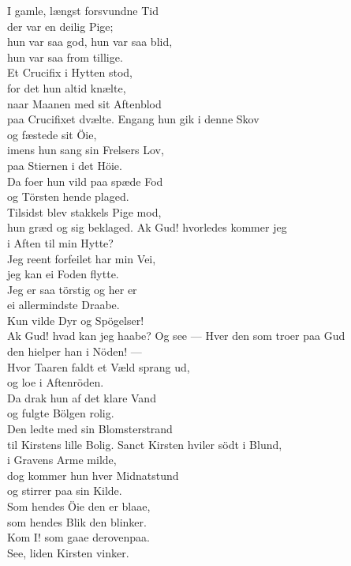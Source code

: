 
\begin{flushleft}
I gamle, længst forsvundne Tid\\
der var en deilig Pige;\\
hun var saa god, hun var saa blid,\\
hun var saa from tillige.\\
Et Crucifix i Hytten stod,\\
for det hun altid knælte,\\
naar Maanen med sit Aftenblod\\
paa Crucifixet dvælte.
\hops
Engang hun gik i denne Skov\\
og fæstede sit Öie,\\
imens hun sang sin Frelsers Lov,\\
paa Stiernen i det Höie.\\
Da foer hun vild paa spæde Fod\\
og Törsten hende plaged.\\
Tilsidst blev stakkels Pige mod,\\
hun græd og sig beklaged.
\hops
Ak Gud! hvorledes kommer jeg\\
i Aften til min Hytte?\\
Jeg reent forfeilet har min Vei,\\
jeg kan ei Foden flytte.\\
Jeg er saa törstig og her er\\
ei allermindste Draabe.\\
Kun vilde Dyr og Spögelser!\\
Ak Gud! hvad kan jeg haabe?
\hops
Og see — Hver den som troer paa Gud\\
den hielper han i Nöden! —\\
Hvor Taaren faldt et Væld sprang ud,\\
og loe i Aftenröden.\\
Da drak hun af det klare Vand\\
og fulgte Bölgen rolig.\\
Den ledte med sin Blomsterstrand\\
til Kirstens lille Bolig.
\hops
Sanct Kirsten hviler södt i Blund,\\
i Gravens Arme milde,\\
dog kommer hun hver Midnatstund\\
og stirrer paa sin Kilde.\\
Som hendes Öie den er blaae,\\
som hendes Blik den blinker.\\
Kom I! som gaae derovenpaa.\\
See, liden Kirsten vinker.\\
\end{flushleft}

